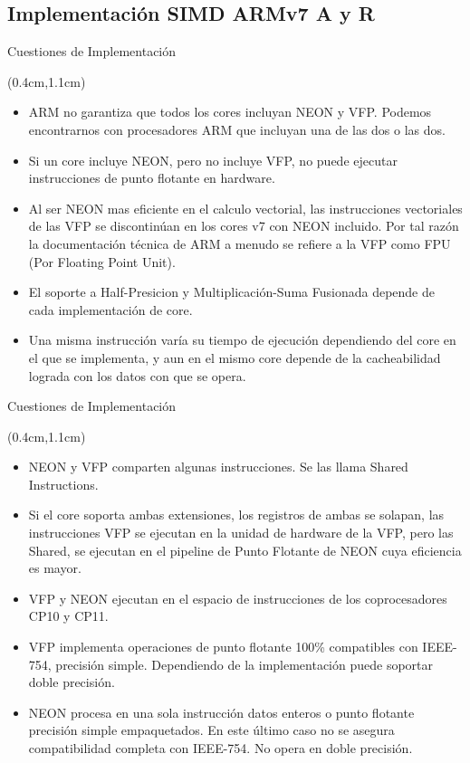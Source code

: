 \subsection{Implementación SIMD ARMv7 A y R}
\begin{frame}{Cuestiones de Implementación}
 \begin{textblock*}{\textwidth}(0.4cm,1.1cm)
  \begin{itemize}[<+->]\justifying
   \item ARM no garantiza que todos los cores incluyan NEON y VFP. Podemos encontrarnos con procesadores ARM que incluyan una de las dos o las dos.
   \item Si un core incluye NEON, pero no incluye VFP, no puede ejecutar instrucciones de punto flotante en hardware.
   \item Al ser NEON mas eficiente en el calculo vectorial, las instrucciones vectoriales de las VFP se discontinúan en los cores v7 con NEON incluido. Por tal razón la documentación técnica de ARM a menudo se refiere a la VFP como FPU (Por Floating Point Unit).
   \item El soporte a Half-Presicion y Multiplicación-Suma Fusionada depende de cada implementación de core.
   \item Una misma instrucción varía su tiempo de ejecución dependiendo del core en el que se implementa, y aun en el mismo core  depende de la cacheabilidad lograda con los datos con que se opera.
  \end{itemize}
 \end{textblock*} 
\end{frame}

\begin{frame}[fragile]{Cuestiones de Implementación}
 \begin{textblock*}{\textwidth}(0.4cm,1.1cm)
  \begin{itemize}[<+->]\justifying
   \item NEON y VFP comparten algunas instrucciones. Se las llama Shared Instructions.
   \item Si el core soporta ambas extensiones, los registros de ambas se solapan, las instrucciones VFP se ejecutan en la unidad de hardware de la VFP, pero las Shared, se ejecutan en el pipeline de Punto Flotante de NEON cuya eficiencia es mayor.
   \item VFP y NEON ejecutan en el espacio de instrucciones de los coprocesadores CP10 y CP11.
   \item VFP implementa operaciones de punto flotante 100\% compatibles con IEEE-754, precisión simple. Dependiendo de la implementación puede soportar doble precisión.
   \item NEON procesa en una sola instrucción datos enteros o punto flotante precisión simple empaquetados. En este último caso no se asegura compatibilidad completa con IEEE-754. No opera en doble precisión.
  \end{itemize}
 \end{textblock*} 
\end{frame}

